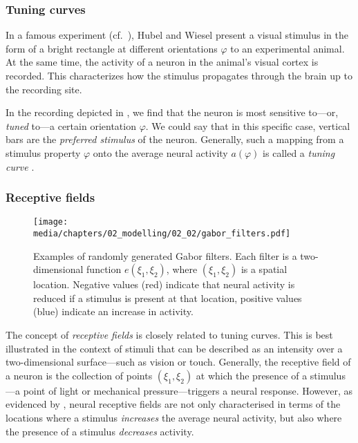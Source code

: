\subsubsection{Tuning curves}
In a famous \citeyear{hubel1959receptive} experiment (cf.~), Hubel and Wiesel present a visual stimulus in the form of a bright rectangle at different orientations $\varphi$ to an experimental animal.
At the same time, the activity of a neuron in the animal's visual cortex is recorded.
This characterizes how the stimulus propagates through the brain up to the recording site.

In the recording depicted in , we find that the neuron is most sensitive to---or, \emph{tuned} to---a certain orientation $\varphi$.
We could say that in this specific case, vertical bars are the \emph{preferred stimulus} of the neuron.
Generally, such a mapping from a stimulus property $\varphi$ onto the average neural activity $a(\varphi)$ is called a \emph{tuning curve} \citep[e.g.,][p.~1112]{vandenbos2015apa}.

\subsubsection{Receptive fields}

\begin{figure}
	\centering
	\texttt{[image: media/chapters/02\_modelling/02\_02/gabor\_filters.pdf]}
	\caption[Examples of randomly generated of Gabor filters]{Examples of randomly generated Gabor filters.
	Each filter is a two-dimensional function $e(\xi_1, \xi_2)$, where $(\xi_1, \xi_2)$ is a spatial location.
	Negative  values (red) indicate that neural activity is reduced if a stimulus is present at that location, positive values (blue) indicate an increase in activity.}
	\label{fig:gabor}
\end{figure}
The concept of \emph{receptive fields} is closely related to tuning curves.
This is best illustrated in the context of stimuli that can be described as an intensity over a two-dimensional surface---such as vision or touch.
Generally, the receptive field of a neuron is the collection of points $(\xi_1, \xi_2)$ at which the presence of a stimulus---a point of light or mechanical pressure---triggers a neural response.
However, as evidenced by \citet{hubel1962receptive}, neural receptive fields are not only characterised in terms of the locations where a stimulus \emph{increases} the average neural activity, but also where the presence of a stimulus \emph{decreases} activity.

